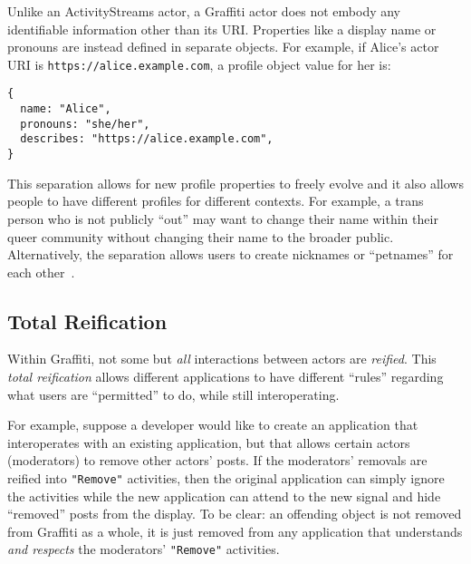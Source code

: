 Unlike an ActivityStreams actor, a Graffiti actor does not embody
any identifiable information other than its
URI.
Properties like a display name or pronouns are instead
defined in separate objects.
For example, if Alice's actor URI is
\texttt{https://\allowbreak{}alice.\allowbreak{}example.\allowbreak{}com}, a profile object value for her is:
\begin{verbatim}
{
  name: "Alice",
  pronouns: "she/her",
  describes: "https://alice.example.com",
}
\end{verbatim}

This separation allows for new profile
properties to freely evolve
and it also allows people to have different profiles for different contexts.
For example, a trans person who is not publicly ``out'' may want to
change their name within their queer community without
changing their name to the broader public.
Alternatively, the separation allows users to create nicknames
or ``petnames'' for each other~\cite{petnames}.


\subsection{Total Reification}
\label{concepts:total-reification}

Within Graffiti, not some but \emph{all} interactions between actors
are \emph{reified}.
This \emph{total reification} allows different applications to have
different ``rules'' regarding what users are ``permitted'' to do, while
still interoperating.

For example, suppose a developer would like to create an application
that interoperates with an existing application,
but that allows certain actors (moderators) to remove other actors' posts.
If the moderators' removals are reified into \texttt{"Remove"} activities,
then the original application can simply ignore the activities
while the new application can attend to the new signal and hide ``removed'' posts from the display.
To be clear: an offending object is not removed from Graffiti as a whole,
it is just removed from any application that understands \emph{and respects}
the moderators' \texttt{"Remove"} activities.%

